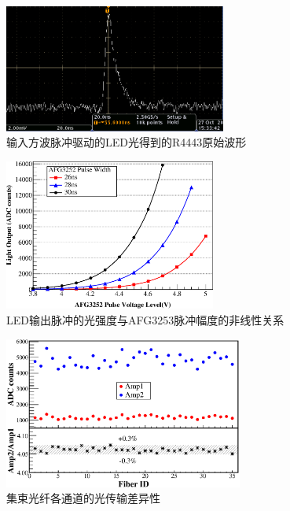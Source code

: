 \begin{figure}[htbp]
	\centering
	\includegraphics[width=0.65\textwidth]{chap/pmt_test/fig/led_pulse.jpg}
	\caption{输入方波脉冲驱动的LED光得到的R4443原始波形}
	\label{fig:pmt_test:led_pulse}
\end{figure}

\begin{figure}[htbp]
	\centering
	\includegraphics[width=0.62\textwidth]{chap/pmt_test/fig/led_response.eps}
	\caption{LED输出脉冲的光强度与AFG3253脉冲幅度的非线性关系}
	\label{fig:pmt_test:led_response}
\end{figure}

\begin{figure}[htbp]
	\centering
	\includegraphics[width=0.7\textwidth]{chap/pmt_test/fig/fiber_difference.eps}
	\caption{集束光纤各通道的光传输差异性}
	\label{fig:pmt_test:fiber_difference}
\end{figure}

